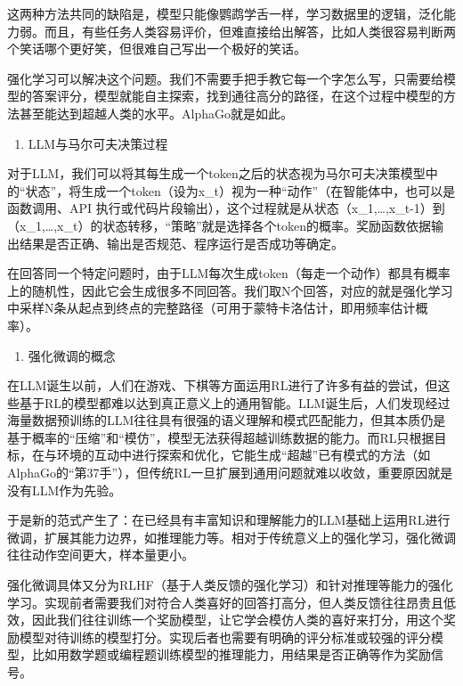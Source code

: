 这两种方法共同的缺陷是，模型只能像鹦鹉学舌一样，学习数据里的逻辑，泛化能力弱。而且，有些任务人类容易评价，但难直接给出解答，比如人类很容易判断两个笑话哪个更好笑，但很难自己写出一个极好的笑话。

强化学习可以解决这个问题。我们不需要手把手教它每一个字怎么写，只需要给模型的答案评分，模型就能自主探索，找到通往高分的路径，在这个过程中模型的方法甚至能达到超越人类的水平。AlphaGo就是如此。

\begin{enumerate}
\def\labelenumi{\arabic{enumi}.}
\tightlist
\item
  LLM与马尔可夫决策过程
\end{enumerate}

对于LLM，我们可以将其每生成一个token之后的状态视为马尔可夫决策模型中的``状态''，将生成一个token（设为x\_t）视为一种``动作''（在智能体中，也可以是函数调用、API 执行或代码片段输出），这个过程就是从状态（x\_1,\ldots,x\_t-1）到（x\_1,\ldots,x\_t）的状态转移，``策略''就是选择各个token的概率。奖励函数依据输出结果是否正确、输出是否规范、程序运行是否成功等确定。

在回答同一个特定问题时，由于LLM每次生成token（每走一个动作）都具有概率上的随机性，因此它会生成很多不同回答。我们取N个回答，对应的就是强化学习中采样N条从起点到终点的完整路径（可用于蒙特卡洛估计，即用频率估计概率）。

\begin{enumerate}
\def\labelenumi{\arabic{enumi}.}
\setcounter{enumi}{1}
\tightlist
\item
  强化微调的概念
\end{enumerate}

在LLM诞生以前，人们在游戏、下棋等方面运用RL进行了许多有益的尝试，但这些基于RL的模型都难以达到真正意义上的通用智能。LLM诞生后，人们发现经过海量数据预训练的LLM往往具有很强的语义理解和模式匹配能力，但其本质仍是基于概率的``压缩''和``模仿''，模型无法获得超越训练数据的能力。而RL只根据目标，在与环境的互动中进行探索和优化，它能生成``超越''已有模式的方法（如AlphaGo的``第37手''），但传统RL一旦扩展到通用问题就难以收敛，重要原因就是没有LLM作为先验。

于是新的范式产生了：在已经具有丰富知识和理解能力的LLM基础上运用RL进行微调，扩展其能力边界，如推理能力等。相对于传统意义上的强化学习，强化微调往往动作空间更大，样本量更小。

强化微调具体又分为RLHF（基于人类反馈的强化学习）和针对推理等能力的强化学习。实现前者需要我们对符合人类喜好的回答打高分，但人类反馈往往昂贵且低效，因此我们往往训练一个奖励模型，让它学会模仿人类的喜好来打分，用这个奖励模型对待训练的模型打分。实现后者也需要有明确的评分标准或较强的评分模型，比如用数学题或编程题训练模型的推理能力，用结果是否正确等作为奖励信号。

